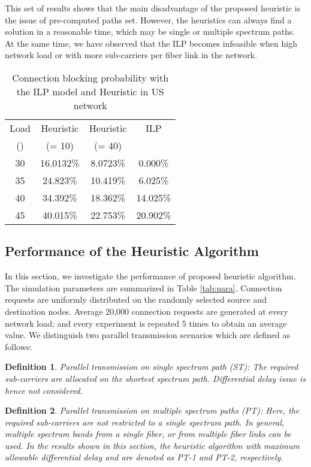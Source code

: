 \documentclass[conference]{IEEEtran}
\newtheorem{definition}{Definition}
\begin{document}
\par This set of results shows that the main disadvantage of the proposed heuristic is the issue of pre-computed paths set. However, the heuristics can always find a solution in a reasonable time, which may be single or multiple spectrum paths. At the same time,  we have observed that the ILP becomes infeasible  when high network load or with more sub-carriers per fiber link in the network.
     
\begin{table}
\centering
   \caption{Connection blocking probability with the ILP model and Heuristic in US network } \label{tab:block-ilp}
\begin{tabular}{ | c | c | c | c |}
        \hline
         Load   & Heuristic &   Heuristic   & ILP \\
         () & (= 10) & (= 40)  &  \\ \hline
  30&        16.0132\% &	8.0723\% &	0.000\% \\ \hline
35&	24.823\%	&10.419\%	&6.025\%\\ \hline
	40&34.392\%&	18.362\%	&14.025\%\\ \hline
	45& 40.015\%&	22.753\%	&20.902\%\\ \hline              
        \end{tabular}
\end{table}


 \subsection{Performance of the Heuristic Algorithm} \label{large}
 In this section, we investigate the performance of  proposed heuristic algorithm. The simulation 
 parameters are summarized in Table \ref{tab:para}. Connection requests are uniformly distributed on the randomly selected source and destination nodes. Average 20,000 connection requests are generated at every network load; and  every experiment is repeated  5 times to obtain an average value.   We distinguish  two parallel transmission scenarios which are defined as follows:
 \begin{definition}
 \emph{Parallel transmission on single spectrum path (ST)}: The required sub-carriers are allocated on the  shortest spectrum path.  Differential delay issue is hence not considered.    
 \end{definition}
 \begin{definition}
 \emph{Parallel transmission on multiple spectrum paths (PT)}: Here, the required sub-carriers are not restricted to a single spectrum path. In general, multiple spectrum bands from a single fiber, or from multiple fiber links can be used. In the results shown in this section, the heuristic algorithm with maximum allowable differential delay  and  are denoted as PT-1 and PT-2, respectively. 
 \end{definition}
 
\end{document}
